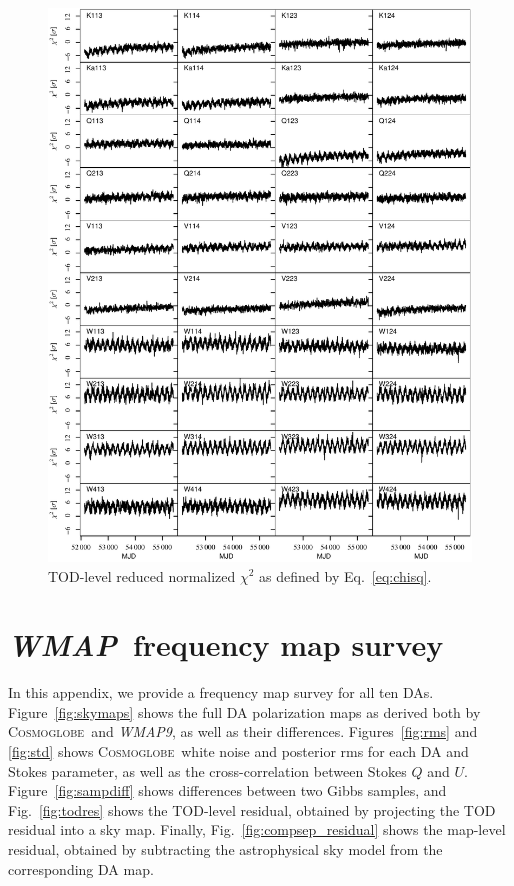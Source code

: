 \documentclass[twocolumn]{../../common/aa}
\def\WMAP{\emph{WMAP}}
\def\WMAPnine{\emph{WMAP9}}
\newcommand{\cosmoglobe}{\textsc{Cosmoglobe}}
\begin{document}
\begin{figure}[p]
	\centering
	\includegraphics[width=\textwidth]{figures/instpar_CG_chisq_v1.pdf}
	\caption{TOD-level reduced normalized $\chi^2$ as defined by Eq.~\eqref{eq:chisq}.}
	\label{fig:chisq}
\end{figure}


\clearpage
\section{\WMAP\ frequency map survey}
\label{sec:map_survey}

\noindent\begin{minipage}{\textwidth}
In this appendix, we provide a frequency map survey for all ten DAs. Figure~\ref{fig:skymaps} shows the full DA polarization maps as derived both by \cosmoglobe\ and \WMAPnine, as well as their differences. Figures~\ref{fig:rms} and \ref{fig:std} shows \cosmoglobe\ white noise and posterior rms for each DA and Stokes parameter, as well as the cross-correlation between Stokes $Q$ and $U$. Figure~\ref{fig:sampdiff} shows differences between two Gibbs samples, and Fig.~\ref{fig:todres} shows the TOD-level residual, obtained by projecting the TOD residual into a sky map. Finally, Fig.~\ref{fig:compsep_residual} shows the map-level residual, obtained by subtracting the astrophysical sky model from the corresponding DA map.
\end{minipage}
\end{document}
